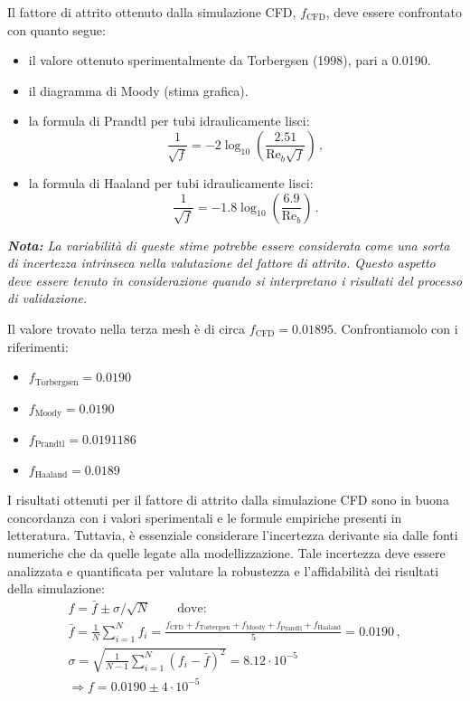 Il fattore di attrito ottenuto dalla simulazione CFD, \(f_{\text{CFD}}\), deve essere confrontato con quanto segue:
\begin{itemize}
    \item il valore ottenuto sperimentalmente da Torbergsen (1998), pari a 0.0190.
    \item il diagramma di Moody (stima grafica).
    \item la formula di Prandtl per tubi idraulicamente lisci:
    \[
    \frac{1}{\sqrt{f}} = -2 \log_{10}\left(\frac{2.51}{\text{Re}_b \sqrt{f}}\right)\,,
    \]
    \item la formula di Haaland per tubi idraulicamente lisci:
    \[
    \frac{1}{\sqrt{f}} = -1.8 \log_{10}\left(\frac{6.9}{\text{Re}_b}\right)\,.
    \]
\end{itemize}

\emph{\textbf{Nota:} La variabilità di queste stime potrebbe essere considerata come una sorta di incertezza intrinseca nella valutazione del fattore di attrito. Questo aspetto deve essere tenuto in considerazione quando si interpretano i risultati del processo di validazione.}

\NotionDivider

Il valore trovato nella terza mesh è di circa $f_{\text{CFD}}=0.01895$. Confrontiamolo con i riferimenti:
\begin{itemize}
    \item $f_{\text{Torbergsen}}=0.0190$
    \item $f_{\text{Moody}}=0.0190$
    \item $f_{\text{Prandtl}}=0.0191186$
    \item $f_{\text{Haaland}}=0.0189$
\end{itemize}

I risultati ottenuti per il fattore di attrito dalla simulazione CFD sono in buona concordanza con i valori sperimentali e le formule empiriche presenti in letteratura. Tuttavia, è essenziale considerare l'incertezza derivante sia dalle fonti numeriche che da quelle legate alla modellizzazione. Tale incertezza deve essere analizzata e quantificata per valutare la robustezza e l'affidabilità dei risultati della simulazione:
\begin{equation*}
\begin{gathered}
f=\bar{f}\pm\sigma/\sqrt{N}\,\qquad\text{dove:}\\
\bar{f}=\frac{1}{N} \sum_{i=1}^{N} f_i =\frac{f_{\text{CFD}}+f_{\text{Torbergsen}}+f_{\text{Moody}}+f_{\text{Prandtl}}+f_{\text{Haaland}}}{5}= 0.0190\,, \\
\sigma= \sqrt{\frac{1}{N-1} \sum_{i=1}^N \left(f_i - \bar{f}\right)^2}=8.12\cdot 10^{-5}\\
\Longrightarrow f=0.0190\pm 4\cdot 10^{-5}
\end{gathered}
\end{equation*}

